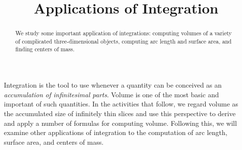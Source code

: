 \documentclass{ximera}
\title{Applications of Integration}
\begin{document}
\begin{abstract}
  We study some important application of integrations: computing volumes of a variety of complicated three-dimensional objects, computing arc length and surface area, and finding centers of mass.
\end{abstract}
\maketitle

Integration is the tool to use whenever a quantity can be conceived as an \textit{accumulation of infinitesimal parts}. 
Volume is one of the most basic and important of such quantities. In the activities that follow, we regard volume as the accumulated size of infinitely thin slices and use this perspective to derive and apply a number of formulas for computing volume. Following this, we will examine other applications of integration to the computation of arc length, surface area, and centers of mass.
\end{document}
